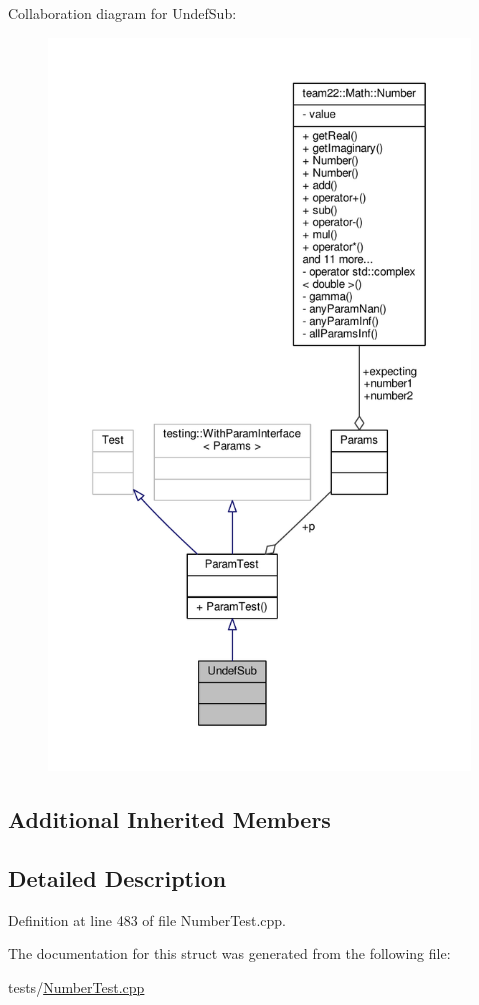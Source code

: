 Collaboration diagram for Undef\+Sub\+:
\nopagebreak
\begin{figure}[H]
\begin{center}
\leavevmode
\includegraphics[height=550pt]{struct_undef_sub__coll__graph}
\end{center}
\end{figure}
\subsection*{Additional Inherited Members}


\subsection{Detailed Description}


Definition at line 483 of file Number\+Test.\+cpp.



The documentation for this struct was generated from the following file\+:\begin{DoxyCompactItemize}
\item 
tests/\hyperlink{_number_test_8cpp}{Number\+Test.\+cpp}\end{DoxyCompactItemize}
